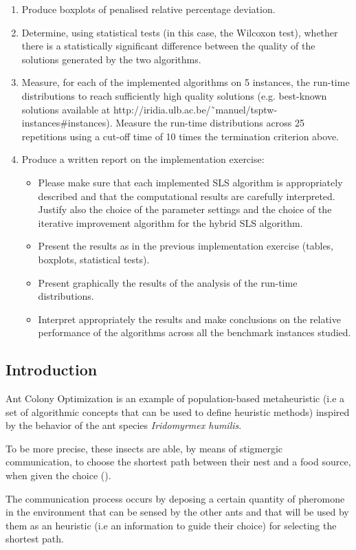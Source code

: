 \begin{homeworkProblem}
\begin{enumerate}
\item Produce boxplots of penalised relative percentage deviation.
\item Determine, using statistical tests (in this case, the Wilcoxon test), whether there is a statistically significant difference between the quality of the solutions generated by the two algorithms.
\item Measure, for each of the implemented algorithms on 5 instances, the run-time distributions to reach sufficiently high quality solutions (e.g. best-known solutions available at http://iridia.ulb.ac.be/˜manuel/tsptw-instances\#instances).
Measure the run-time distributions across 25 repetitions using a cut-off time of 10 times the termination criterion above.
\item Produce a written report on the implementation exercise:
\begin{itemize}
  \item Please make sure that each implemented SLS algorithm is appropriately described and that the computational results are carefully interpreted. Justify also the choice of the parameter settings and the choice
of the iterative improvement algorithm for the hybrid SLS algorithm.
  \item Present the results as in the previous implementation exercise (tables, boxplots, statistical tests).
  \item Present graphically the results of the analysis of the run-time distributions.
  \item Interpret appropriately the results and make conclusions on the relative performance of the algorithms across all the benchmark instances studied.
\end{itemize}
\end{enumerate}

\subsection{Introduction} \label{sec:intro}
Ant Colony Optimization is an example of population-based metaheuristic (i.e a set of algorithmic concepts that can be used to define heuristic methods) inspired by the behavior of the ant species \emph{Iridomyrmex humilis}.

To be more precise, these insects are able, by means of stigmergic communication, to choose the shortest path between their nest and a food source, when given the choice (\cite{deneubourg1990self}).

The communication process occurs by deposing a certain quantity of pheromone in the environment that can be sensed by the other ants and that will be used by them as an heuristic (i.e an information to guide their choice) for selecting the shortest path.


\end{homeworkProblem}
